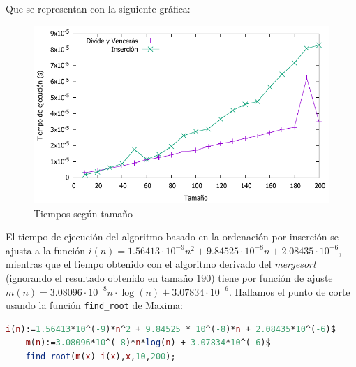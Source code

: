 \vspace*{1cm}

\prefIns
{}\prefDVt
{} {\prefIns}

\pgfplotstabletypeset[
display columns/0/.style={column name=Tamaño},
display columns/1/.style={column name=Inserción},
display columns/2/.style={column name=Mergesort},
]{\prefIns}

\vspace*{1cm}

Que se representan con la siguiente gráfica:

\begin{figure}[H]\includegraphics[width=14cm]{img/umbral_preferencias.pdf} \centering
	\caption{Tiempos según tamaño}
\end{figure}

El tiempo de ejecución del algoritmo basado en la ordenación por inserción se ajusta a la función $i(n) = 1.56413 \cdot 10^{-9} n^2 + 9.84525 \cdot 10^{-8} n + 2.08435 \cdot 10^{-6}$, mientras que el tiempo obtenido con el algoritmo derivado del \textit{mergesort} (ignorando el resultado obtenido en tamaño $190$) tiene por función de ajuste $m(n) = 3.08096 \cdot 10^{-8} n \cdot \log(n) + 3.07834 \cdot 10^{-6}$. Hallamos el punto de corte usando la función \texttt{find\_root} de Maxima:

\begin{lstlisting}[language=Maxima]
	i(n):=1.56413*10^(-9)*n^2 + 9.84525 * 10^(-8)*n + 2.08435*10^(-6)$
	m(n):=3.08096*10^(-8)*n*log(n) + 3.07834*10^(-6)$
	find_root(m(x)-i(x),x,10,200);
\end{lstlisting}

